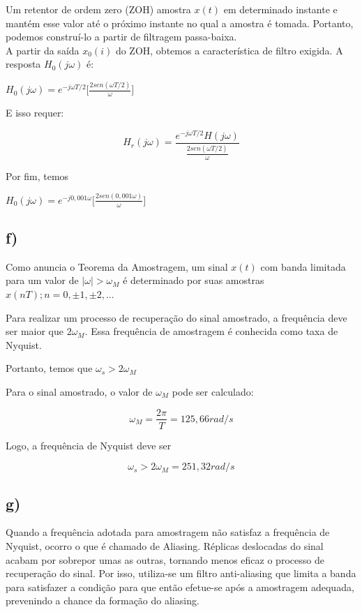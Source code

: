 \documentclass{article}[a4paper,12pt,twoside]
\begin{document}
 Um retentor de ordem zero (ZOH) amostra $x(t)$ em determinado instante e mantém esse valor até o próximo instante no qual a amostra é tomada. Portanto, podemos construí-lo a partir de filtragem passa-baixa.\\
 A partir da saída $x_0(i)$ do ZOH, obtemos a característica de filtro exigida. A resposta $H_0(j\omega)$ é:
 
 \begin{center}
     $H_0(j\omega) = e^{-j\omega T/2}\bigg[\frac{2sen(\omega T/2)}{\omega}\bigg]$
 \end{center}

E isso requer:


 \begin{center}
     $$H_r(j\omega) = \frac{e^{-j\omega T/2}H(j\omega)}{\frac{2sen(\omega T/2)}{\omega}}$$
 \end{center}
Por fim, temos

\begin{center}
    $H_0(j\omega) = e^{-j0,001\omega}\bigg[\frac{2sen(0,001\omega)}{\omega}\bigg]$
    
\end{center}

\subsection{f)}

Como anuncia o Teorema da Amostragem, um sinal $x(t)$ com banda limitada para um valor de $|\omega| > \omega_M$ é determinado por suas amostras $x(nT); n = 0, \pm1, \pm2, ...$

Para realizar um processo de recuperação do sinal amostrado, a frequência deve ser maior que $2\omega_M$. Essa frequência de amostragem é conhecida como taxa de Nyquist.

Portanto, temos que $\omega_s > 2\omega_M$

Para o sinal amostrado, o valor de $\omega_M$ pode ser calculado:

\begin{center}
    $$\omega_M = \frac{2\pi}{T} = 125,66 rad/s$$
\end{center}

Logo, a frequência de Nyquist deve ser

\begin{center}
    $$\omega_s > 2\omega_M = 251,32 rad/s$$
\end{center}

\subsection{g)}
Quando a frequência adotada para amostragem não satisfaz a frequência de Nyquist, ocorro o que é chamado de Aliasing. Réplicas deslocadas do sinal acabam por sobrepor umas as outras, tornando menos eficaz o processo de recuperação do sinal. Por isso, utiliza-se um filtro anti-aliasing que limita a banda para satisfazer a condição para que então efetue-se após a amostragem adequada, prevenindo a chance da formação do aliasing.
\end{document}
